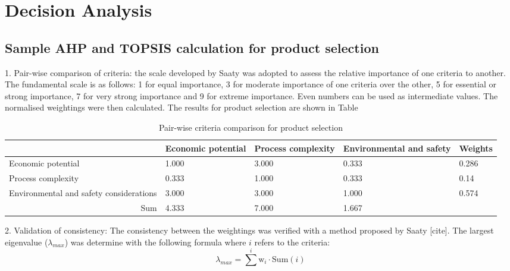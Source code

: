 \section{Decision Analysis}
\label{app:matrix}

\subsection{Sample AHP and TOPSIS calculation for product selection}

1. Pair-wise comparison of criteria: the scale developed by Saaty was adopted to assess the relative importance of one criteria to another. The fundamental scale is as follows: 1 for equal importance, 3 for moderate importance of one criteria over the other, 5 for essential or strong importance, 7 for very strong importance and 9 for extreme importance. Even numbers can be used as intermediate values. The normalised weightings were then calculated. The results for product selection are shown in Table

\begin{table}[]
\centering
\caption{Pair-wise criteria comparison for product selection}
\label{teb:pairwise}
\begin{tabular}{l|l|l|l|l}
\cline{2-5}
                                                                & Economic potential & Process complexity & Environmental and safety & \multicolumn{1}{l|}{Weights} \\ \hline
\multicolumn{1}{|l|}{Economic potential}                        & 1.000              & 3.000              & 0.333                    & \multicolumn{1}{l|}{0.286}   \\ \hline
\multicolumn{1}{|l|}{Process complexity}                        & 0.333              & 1.000              & 0.333                    & \multicolumn{1}{l|}{0.14}    \\ \hline
\multicolumn{1}{|l|}{Environmental and   safety considerations} & 3.000              & 3.000              & 1.000                    & \multicolumn{1}{l|}{0.574}   \\ \hline
\multicolumn{1}{|r|}{Sum}                                       & 4.333              & 7.000              & 1.667                    &                              \\ \cline{1-4}
\end{tabular}
\end{table}


2. Validation of consistency: The consistency between the weightings was verified with a method proposed by Saaty [cite]. The largest eigenvalue ($\lambda_{max}$) was determine with the following formula where $i$ refers to the criteria:
\begin{equation}
    \lambda_{max}=\sum^{i} \mathrm{w}_{i}\cdot \mathrm{Sum}(i)
\end{equation}

